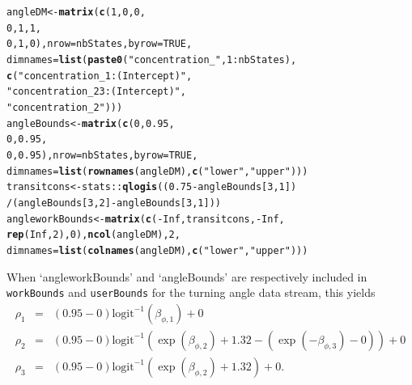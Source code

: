 \documentclass[12pt]{article}\usepackage[]{graphicx}\usepackage[]{xcolor}
\makeatletter
\newcommand{\hlnum}[1]{\textcolor[rgb]{0.686,0.059,0.569}{#1}}%
\newcommand{\hlsng}[1]{\textcolor[rgb]{0.192,0.494,0.8}{#1}}%
\newcommand{\hlopt}[1]{\textcolor[rgb]{0,0,0}{#1}}%
\newcommand{\hldef}[1]{\textcolor[rgb]{0.345,0.345,0.345}{#1}}%
\newcommand{\hlkwb}[1]{\textcolor[rgb]{0.69,0.353,0.396}{#1}}%
\newcommand{\hlkwc}[1]{\textcolor[rgb]{0.333,0.667,0.333}{#1}}%
\newcommand{\hlkwd}[1]{\textcolor[rgb]{0.737,0.353,0.396}{\textbf{#1}}}%
\newenvironment{kframe}{%
 \def\at@end@of@kframe{}%
 \ifinner\ifhmode%
  \def\at@end@of@kframe{\end{minipage}}%
  \begin{minipage}{\columnwidth}%
 \fi\fi%
 \def\FrameCommand##1{\hskip\@totalleftmargin \hskip-\fboxsep
 \colorbox{shadecolor}{##1}\hskip-\fboxsep
     \hskip-\linewidth \hskip-\@totalleftmargin \hskip\columnwidth}%
 \MakeFramed {\advance\hsize-\width
   \@totalleftmargin\z@ \linewidth\hsize
   \@setminipage}}%
 {\par\unskip\endMakeFramed%
 \at@end@of@kframe}
\newenvironment{knitrout}{}{} %
\makeatother
\begin{document}
\begin{knitrout}
\color{fgcolor}\begin{kframe}
\begin{alltt}
\hldef{angleDM} \hlkwb{<-} \hlkwd{matrix}\hldef{(}\hlkwd{c}\hldef{(}\hlnum{1}\hldef{,}\hlnum{0}\hldef{,}\hlnum{0}\hldef{,}
                    \hlnum{0}\hldef{,}\hlnum{1}\hldef{,}\hlnum{1}\hldef{,}
                    \hlnum{0}\hldef{,}\hlnum{1}\hldef{,}\hlnum{0}\hldef{),}\hlkwc{nrow}\hldef{=nbStates,}\hlkwc{byrow}\hldef{=}\hlnum{TRUE}\hldef{,}
                  \hlkwc{dimnames}\hldef{=}\hlkwd{list}\hldef{(}\hlkwd{paste0}\hldef{(}\hlsng{"concentration_"}\hldef{,}\hlnum{1}\hlopt{:}\hldef{nbStates),}
                                \hlkwd{c}\hldef{(}\hlsng{"concentration_1:(Intercept)"}\hldef{,}
                                  \hlsng{"concentration_23:(Intercept)"}\hldef{,}
                                  \hlsng{"concentration_2"}\hldef{)))}
\hldef{angleBounds} \hlkwb{<-} \hlkwd{matrix}\hldef{(}\hlkwd{c}\hldef{(}\hlnum{0}\hldef{,}\hlnum{0.95}\hldef{,}
                        \hlnum{0}\hldef{,}\hlnum{0.95}\hldef{,}
                        \hlnum{0}\hldef{,}\hlnum{0.95}\hldef{),}\hlkwc{nrow}\hldef{=nbStates,}\hlkwc{byrow}\hldef{=}\hlnum{TRUE}\hldef{,}
                      \hlkwc{dimnames}\hldef{=}\hlkwd{list}\hldef{(}\hlkwd{rownames}\hldef{(angleDM),}\hlkwd{c}\hldef{(}\hlsng{"lower"}\hldef{,}\hlsng{"upper"}\hldef{)))}
\hldef{transitcons} \hlkwb{<-} \hldef{stats}\hlopt{::}\hlkwd{qlogis}\hldef{((}\hlnum{0.75} \hlopt{-} \hldef{angleBounds[}\hlnum{3}\hldef{,}\hlnum{1}\hldef{])}
                           \hlopt{/}\hldef{(angleBounds[}\hlnum{3}\hldef{,}\hlnum{2}\hldef{]} \hlopt{-} \hldef{angleBounds[}\hlnum{3}\hldef{,}\hlnum{1}\hldef{]))}
\hldef{angleworkBounds} \hlkwb{<-} \hlkwd{matrix}\hldef{(}\hlkwd{c}\hldef{(}\hlopt{-}\hlnum{Inf}\hldef{,transitcons,}\hlopt{-}\hlnum{Inf}\hldef{,}
                            \hlkwd{rep}\hldef{(}\hlnum{Inf}\hldef{,}\hlnum{2}\hldef{),}\hlnum{0}\hldef{),}\hlkwd{ncol}\hldef{(angleDM),}\hlnum{2}\hldef{,}
                          \hlkwc{dimnames}\hldef{=}\hlkwd{list}\hldef{(}\hlkwd{colnames}\hldef{(angleDM),}\hlkwd{c}\hldef{(}\hlsng{"lower"}\hldef{,}\hlsng{"upper"}\hldef{)))}
\end{alltt}
\end{kframe}
\end{knitrout}
\noindent When `angleworkBounds' and `angleBounds' are respectively included in \verb|workBounds| and \verb|userBounds| for the turning angle data stream, this yields
\begin{eqnarray*}
\rho_1 &=& \left(0.95-0\right) \text{logit}^{-1} \left( \beta_{\phi,1} \right) + 0 \\
\rho_2 &=& \left(0.95-0\right) \text{logit}^{-1} \left( \exp(\beta_{\phi,2}) + 1.32 - \left( \exp(-\beta_{\phi,3} ) - 0 \right) \right) + 0 \\
\rho_3 &=& \left(0.95-0\right) \text{logit}^{-1} \left( \exp(\beta_{\phi,2}) + 1.32 \right) + 0.
\end{eqnarray*}
\end{document}
